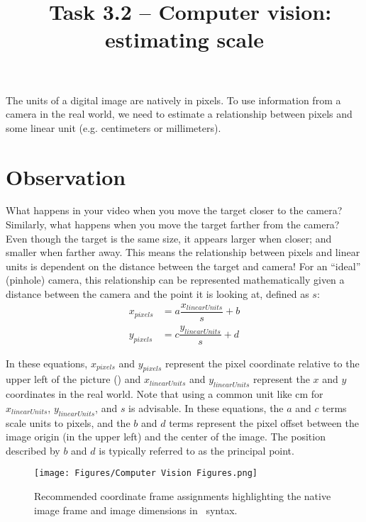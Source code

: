 \documentclass{tufte-handout}
\title{\usnaCourseNumber\ Task 3.2 -- Computer vision: estimating scale}
\author{\usnaInstructorShort}
\date{\printdate{\courseWeekTwo}}
\begin{document}
\maketitle
The units of a digital image are natively in pixels. To use information from a camera in the real world, we need to estimate a relationship between pixels and some linear unit (e.g. centimeters or millimeters).

\section{Observation}
What happens in your video when you move the target closer to the camera? Similarly, what happens when you move the target farther from the camera? Even though the target is the same size, it appears larger when closer; and smaller when farther away. This means the relationship between pixels and linear units is dependent on the distance between the target and camera!
For an ``ideal'' (pinhole) camera, this relationship can be represented mathematically given a distance between the camera and the point it is looking at, defined as $s$:
\begin{align}
x_{pixels} &= a \dfrac{x_{linearUnits}}{s} + b \label{eq:1} \\
y_{pixels} &= c \dfrac{y_{linearUnits}}{s} + d \label{eq:2}
\end{align}

In these equations, $x_{pixels}$ and $y_{pixels}$ represent the pixel coordinate relative to the upper left of the picture () and $x_{linearUnits}$ and $y_{linearUnits}$ represent the  $x$ and $y$ coordinates in the real world. Note that using a common unit like \si{\centi\meter} for $x_{linearUnits}$, $y_{linearUnits}$, and $s$ is advisable. In these equations, the $a$ and $c$  terms scale units to pixels, and the $b$ and $d$ terms represent the pixel offset between the image origin (in the upper left) and the center of the image. The position described by $b$ and $d$ is typically referred to as the principal point. 

\begin{figure}
\begin{center}
\texttt{[image: Figures/Computer Vision Figures.png]}
\end{center}
\caption{Recommended coordinate frame assignments highlighting the native image frame and image dimensions in \Matlab\ syntax.}
\label{fig:1}
\end{figure}
\end{document}
